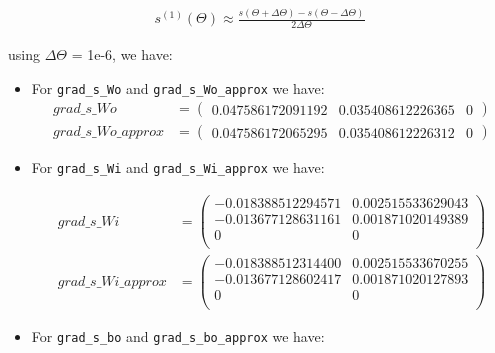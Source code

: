\documentclass{article}
\begin{document}
\begin{align*}
s^{(1)}(\Theta) \approx \frac{s(\Theta + \Delta \Theta) - s(\Theta - \Delta \Theta)}{2 \Delta \Theta}
\end{align*}


using $\Delta \Theta$ = 1e-6, we have:
\begin{itemize}
\item For \texttt{grad\_s\_Wo} and \texttt{grad\_s\_Wo\_approx} we have:
	\begin{align*}
	grad\_s\_Wo &=
	\begin{pmatrix} 
	0.047586172091192 & 0.035408612226365 & 0
	\end{pmatrix}
	\\
	grad\_s\_Wo\_approx &=
	\begin{pmatrix} 
	0.047586172065295 & 0.035408612226312 & 0
	\end{pmatrix}
	\end{align*}

\item For \texttt{grad\_s\_Wi} and \texttt{grad\_s\_Wi\_approx} we have:

	\begin{align*}
	grad\_s\_Wi &=
	\begin{pmatrix} 
	-0.018388512294571 & 0.002515533629043 \\
	-0.013677128631161 & 0.001871020149389 \\
	0 & 0 \\
	\end{pmatrix}
	\\
	grad\_s\_Wi\_approx &=
	\begin{pmatrix} 
	-0.018388512314400 & 0.002515533670255 \\
	-0.013677128602417 & 0.001871020127893 \\
	0 & 0 \\
	\end{pmatrix}
	\end{align*}
	
\item For \texttt{grad\_s\_bo} and \texttt{grad\_s\_bo\_approx} we have:


\end{itemize}
\end{document}
